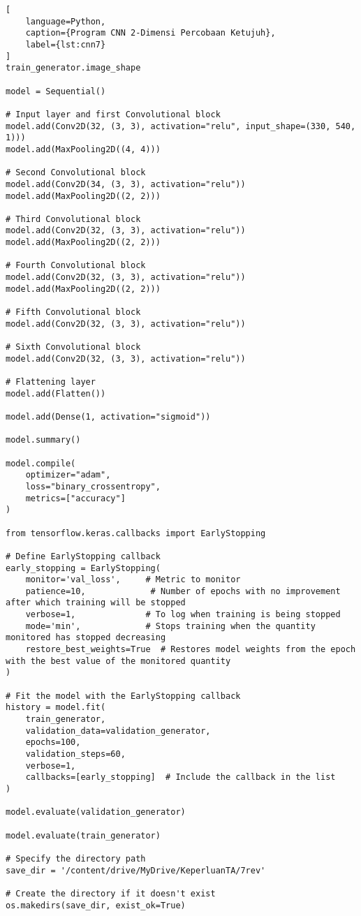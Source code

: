 \begin{lstlisting}[
    language=Python,
    caption={Program CNN 2-Dimensi Percobaan Ketujuh},
    label={lst:cnn7}
]
train_generator.image_shape

model = Sequential()

# Input layer and first Convolutional block
model.add(Conv2D(32, (3, 3), activation="relu", input_shape=(330, 540, 1)))
model.add(MaxPooling2D((4, 4)))

# Second Convolutional block
model.add(Conv2D(34, (3, 3), activation="relu"))
model.add(MaxPooling2D((2, 2)))

# Third Convolutional block
model.add(Conv2D(32, (3, 3), activation="relu"))
model.add(MaxPooling2D((2, 2)))

# Fourth Convolutional block
model.add(Conv2D(32, (3, 3), activation="relu"))
model.add(MaxPooling2D((2, 2)))

# Fifth Convolutional block
model.add(Conv2D(32, (3, 3), activation="relu"))

# Sixth Convolutional block
model.add(Conv2D(32, (3, 3), activation="relu"))

# Flattening layer
model.add(Flatten())

model.add(Dense(1, activation="sigmoid"))

model.summary()

model.compile(
    optimizer="adam",
    loss="binary_crossentropy",
    metrics=["accuracy"]
)

from tensorflow.keras.callbacks import EarlyStopping

# Define EarlyStopping callback
early_stopping = EarlyStopping(
    monitor='val_loss',     # Metric to monitor
    patience=10,             # Number of epochs with no improvement after which training will be stopped
    verbose=1,              # To log when training is being stopped
    mode='min',             # Stops training when the quantity monitored has stopped decreasing
    restore_best_weights=True  # Restores model weights from the epoch with the best value of the monitored quantity
)

# Fit the model with the EarlyStopping callback
history = model.fit(
    train_generator,
    validation_data=validation_generator,
    epochs=100,
    validation_steps=60,
    verbose=1,
    callbacks=[early_stopping]  # Include the callback in the list
)

model.evaluate(validation_generator)

model.evaluate(train_generator)

# Specify the directory path
save_dir = '/content/drive/MyDrive/KeperluanTA/7rev'

# Create the directory if it doesn't exist
os.makedirs(save_dir, exist_ok=True)


\end{lstlisting}
